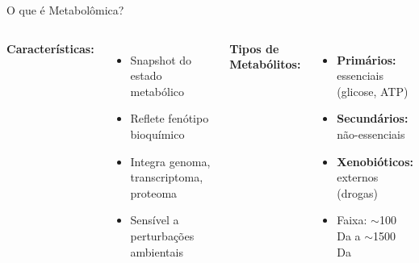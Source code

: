 \begin{frame}{O que é Metabolômica?}

\vspace{0.3cm}

\begin{columns}
\textbf{Características:}
\begin{itemize}
    \item Snapshot do estado metabólico
    \item Reflete fenótipo bioquímico
    \item Integra genoma, transcriptoma, proteoma
    \item Sensível a perturbações ambientais
\end{itemize}

\textbf{Tipos de Metabólitos:}
\begin{itemize}
    \item \textbf{Primários:} essenciais (glicose, ATP)
    \item \textbf{Secundários:} não-essenciais
    \item \textbf{Xenobióticos:} externos (drogas)
    \item Faixa: $\sim$100 Da a $\sim$1500 Da
\end{itemize}
\end{columns}

\vspace{0.3cm}

\end{frame}

